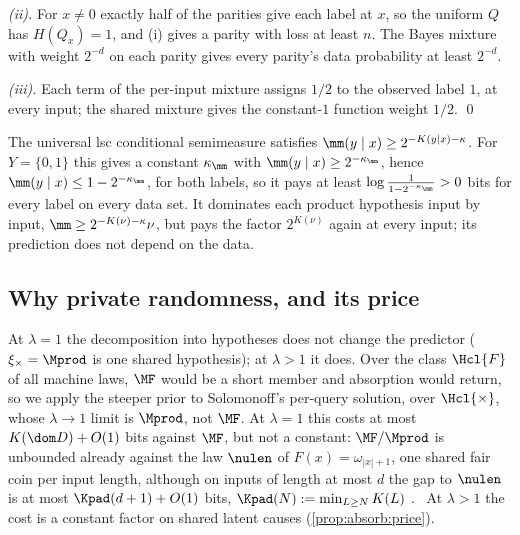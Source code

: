 \emph{(ii).} For $x\ne0$ exactly half of the parities give each label at $x$, so the uniform $Q$ has $H(Q_x)=1$, and (i) gives a parity with loss at least $n$. The Bayes mixture with weight $2^{-d}$ on each parity gives every parity's data probability at least $2^{-d}$.

\emph{(iii).} Each term of the per-input mixture assigns $1/2$ to the observed label $1$, at every input; the shared mixture gives the constant-$1$ function weight $1/2$. \qed

\begin{remark}\label{rem:absorb:condsemi}
The universal lsc conditional semimeasure satisfies $\mm(y\mid x)\ge2^{-K(y\mid x)-\kappa}$. For $Y=\{0,1\}$ this gives a constant $\kappa_{\mm}$ with $\mm(y\mid x)\ge2^{-\kappa_{\mm}}$, hence $\mm(y\mid x)\le1-2^{-\kappa_{\mm}}$, for both labels, so it pays at least $\log\frac1{1-2^{-\kappa_{\mm}}}>0$ bits for every label on every data set. It dominates each product hypothesis input by input, $\mm\ge2^{-K(\nu)-\kappa}\nu$, but pays the factor $2^{K(\nu)}$ again at every input; its prediction does not depend on the data.
\end{remark}

\subsection{Why private randomness, and its price}\label{app:absorb:price}

\begin{remark}\label{rem:absorb:why}
At $\lambda=1$ the decomposition into hypotheses does not change the predictor ($\xi_\times=\Mprod$ is one shared hypothesis); at $\lambda>1$ it does. Over the class $\Hcl{F}$ of all machine laws, $\MF$ would be a short member and absorption would return, so we apply the steeper prior to Solomonoff's per-query solution, over $\Hcl{\times}$, whose $\lambda\to1$ limit is $\Mprod$, not $\MF$. At $\lambda=1$ this costs at most $K(\dom D)+O(1)$ bits against $\MF$, but not a constant: $\MF/\Mprod$ is unbounded already against the law $\nulen$ of $F(x)=\omega_{|x|+1}$, one shared fair coin per input length, although on inputs of length at most $d$ the gap to $\nulen$ is at most $\Kpad(d+1)+O(1)$ bits, $\Kpad(N):=\min_{L\ge N}K(L)$ \citep[Theorem~4.4, Proposition~4.7 and Remark~4.8]{claudeSFI2026fundamentals}.%
\ At $\lambda>1$ the cost is a constant factor on shared latent causes (\cref{prop:absorb:price}).
\end{remark}

